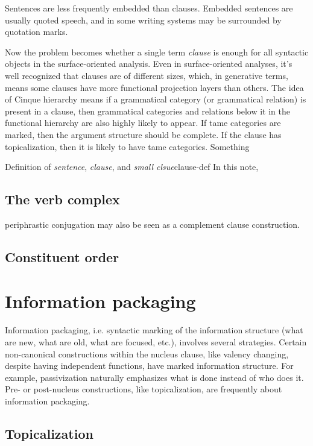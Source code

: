 \documentclass[UTF8, a4paper, oneside, scheme=plain]{ctexart}
\newcommand*{\term}[1]{\emph{#1}}
\begin{document}
Sentences are less frequently embedded than clauses.
Embedded sentences are usually quoted speech,
and in some writing systems may be surrounded by quotation marks.

Now the problem becomes whether a single term \term{clause} is enough 
for all syntactic objects in the surface-oriented analysis.
Even in surface-oriented analyses,
it's well recognized that clauses are of different sizes,
which, in generative terms, 
means some clauses have more functional projection layers than others.
The idea of Cinque hierarchy means if a grammatical category (or grammatical relation)
is present in a clause,
then grammatical categories and relations below it in the functional hierarchy 
are also highly likely to appear.
If \ac{tame} categories are marked,
then the argument structure should be complete.
If the clause has topicalization,
then it is likely to have \ac{tame} categories.
Something 

\begin{infobox}{Definition of \term{sentence}, \term{clause}, and \term{small clsue}}{clause-def}
    In this note, 
\end{infobox}

\subsection{The verb complex}

periphrastic conjugation may also be seen as a complement clause construction. %

\subsection{Constituent order}


\section{Information packaging}

Information packaging, i.e. syntactic marking of the information structure
(what are new, what are old, what are focused, etc.),
involves several strategies.
Certain non-canonical constructions within the nucleus clause, 
like valency changing, 
despite having independent functions,
have marked information structure.
For example, passivization naturally emphasizes what is done instead of who does it.
Pre- or post-nucleus constructions,
like topicalization, 
are frequently about information packaging.


\subsection{Topicalization}
\end{document}

